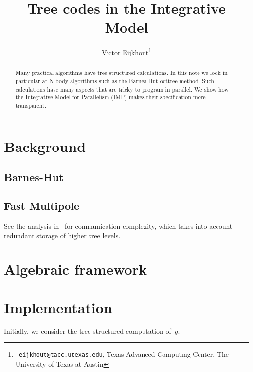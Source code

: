 \documentclass[11pt,fleqn,preprint]{impreport}
\title[IMP nbody]{Tree codes in the Integrative Model}
\author[Eijkhout]{Victor Eijkhout\thanks{{\tt
      eijkhout@tacc.utexas.edu}, Texas Advanced Computing Center, The
    University of Texas at Austin}}
\begin{document}
\maketitle

\begin{abstract}
Many practical algorithms have tree-structured calculations.
In this note we look in particular at N-body algorithms
such as the Barnes-Hut octtree method.
Such calculations have many aspects that are tricky to program
in parallel. We show how the Integrative Model for Parallelism (IMP)
makes their specification more transparent.
\end{abstract}

\section{Background}

\subsection{Barnes-Hut}



\subsection{Fast Multipole}

See the analysis in~\cite{Yokota:fmm-complexity} for communication
complexity, which takes into account redundant storage of higher tree levels.

\section{Algebraic framework}


\section{Implementation}

Initially, we consider the tree-structured computation of~$g$.





\end{document}
